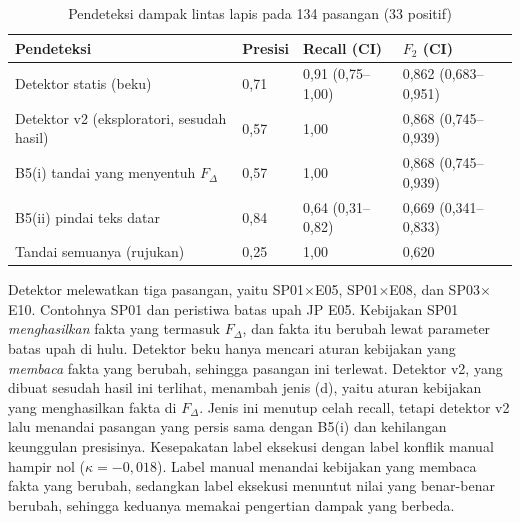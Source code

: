 \documentclass[conference]{IEEEtran}
\makeatletter
\DeclareRobustCommand{\en}[1]{{\usefont{\f@encoding}{\f@family}{\f@series}{it}#1\/}}
\makeatother
\begin{document}
\begin{table}[t]
\centering
\caption{Pendeteksi dampak lintas lapis pada 134 pasangan (33 positif)}
\label{tab:rq4}
\scriptsize
\setlength{\tabcolsep}{3pt}
\begin{tabularx}{\columnwidth}{@{}L P{0.9cm} P{1.6cm} P{1.75cm}@{}}
\toprule
\textbf{Pendeteksi} & \textbf{Presisi} & \textbf{\en{Recall}} (CI) & $F_2$ (CI) \\
\midrule
Detektor statis (beku) & 0,71 & 0,91 (0,75--1,00) & 0,862 (0,683--0,951) \\
Detektor v2 (eksploratori, sesudah hasil) & 0,57 & 1,00 & 0,868 (0,745--0,939) \\
B5(i) tandai yang menyentuh $F_\Delta$ & 0,57 & 1,00 & 0,868 (0,745--0,939) \\
B5(ii) pindai teks datar & 0,84 & 0,64 (0,31--0,82) & 0,669 (0,341--0,833) \\
Tandai semuanya (rujukan) & 0,25 & 1,00 & 0,620 \\
\bottomrule
\end{tabularx}
\end{table}

Detektor melewatkan tiga pasangan, yaitu SP01$\times$E05, SP01$\times$E08, dan SP03$\times$E10. Contohnya SP01 dan peristiwa batas upah JP E05. Kebijakan SP01 \emph{menghasilkan} fakta yang termasuk $F_\Delta$, dan fakta itu berubah lewat parameter batas upah di hulu. Detektor beku hanya mencari aturan kebijakan yang \emph{membaca} fakta yang berubah, sehingga pasangan ini terlewat. Detektor v2, yang dibuat sesudah hasil ini terlihat, menambah jenis (d), yaitu aturan kebijakan yang menghasilkan fakta di $F_\Delta$. Jenis ini menutup celah \en{recall}, tetapi detektor v2 lalu menandai pasangan yang persis sama dengan B5(i) dan kehilangan keunggulan presisinya. Kesepakatan label eksekusi dengan label konflik manual hampir nol ($\kappa = -0{,}018$). Label manual menandai kebijakan yang membaca fakta yang berubah, sedangkan label eksekusi menuntut nilai yang benar-benar berubah, sehingga keduanya memakai pengertian dampak yang berbeda.
\end{document}
